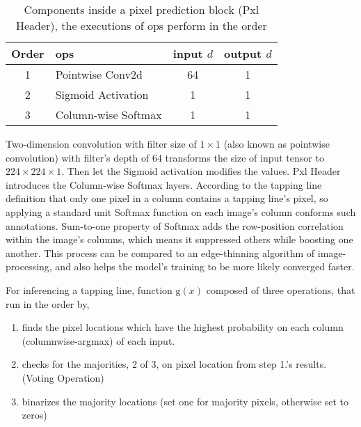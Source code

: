 \documentclass[default,pdflatex,iicol]{sn-jnl}%
\begin{document}
\begin{table}[]
\centering
\caption{Components inside a pixel prediction block (Pxl Header), the executions of ops perform in the order}
\label{tab-pxlheader}
\begin{minipage}{\linewidth}
\begin{center}
\begin{tabular}{@{}clcc@{}}%
\toprule
Order 	& ops 	& \textbf{input} $d$\footnotemark[1]  & \textbf{output} $d$\footnotemark[1]	\\ \midrule
1	& Pointwise Conv2d	& 64  & 1 \\
2	& Sigmoid Activation	& 1  & 1 \\
3	& Column-wise Softmax   & 1 & 1 \\ \bottomrule
\end{tabular}%
\end{center}
\end{minipage}
\end{table}

Two-dimension convolution with filter size of $1\times1$ (also known as pointwise convolution) with filter's depth of 64 transforms the size of input tensor to $224\times 224\times 1$. Then let the Sigmoid activation modifies the values. Pxl Header introduces the Column-wise Softmax layers. According to the tapping line definition that only one pixel in a column contains a tapping line's pixel, so applying a standard unit Softmax function on each image's column conforms such annotations. Sum-to-one property of Softmax adds the row-position correlation within the image's columns, which means it suppressed others while boosting one another. This process can be compared to an edge-thinning algorithm of image-processing, and also helps the model's training to be more likely converged faster. 

For inferencing a tapping line, function $\mathrm{g}(x)$ composed of three operations, that run in the order by,
\begin{enumerate}
\item finds the pixel locations which have the highest probability on each column (columnwise-argmax) of each input.
\item checks for the majorities, 2 of 3, on pixel location from step 1.'s results. (Voting Operation)
\item binarizes the majority locations (set one for majority pixels, otherwise set to zeros)
\end{enumerate}
\end{document}
